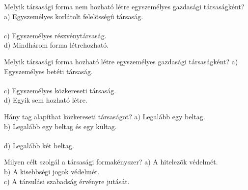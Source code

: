 \begin{frame}

\begin{tcolorbox}[title={63. Kérdés}]
Melyik társasági forma nem hozható létre egyszemélyes gazdasági társaságként?
\tcblower
a) Egyszemélyes korlátolt felelõsségû társaság.\\
\\
c) Egyszemélyes részvénytársaság.\\
d) Mindhárom forma létrehozható.
\end{tcolorbox}

\begin{tcolorbox}[title={64. Kérdés}]
Melyik társasági forma hozható létre egyszemélyes gazdasági társaságként?
\tcblower
a) Egyszemélyes betéti társaság.\\
\\
c) Egyszemélyes közkereseti társaság.\\
d) Egyik sem hozható létre.
\end{tcolorbox}

\begin{tcolorbox}[title={65. Kérdés}]
Hány tag alapíthat közkereseti társaságot?
\tcblower
a) Legalább egy beltag.\\
b) Legalább egy beltag és egy kültag.\\
\\
d) Legalább két beltag.
\end{tcolorbox}

\begin{tcolorbox}[title={66. Kérdés}]
Milyen célt szolgál a társasági formakényszer?
\tcblower
a) A hitelezõk védelmét.\\
b) A kisebbségi jogok védelmét.\\
c) A társulási szabadság érvényre jutását.\\
\end{tcolorbox}
 
\end{frame}


